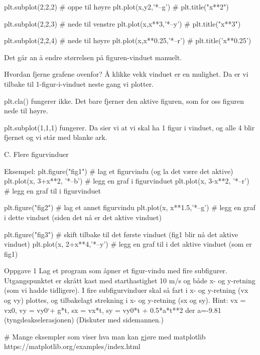 plt.subplot(2,2,2)          # oppe til høyre
plt.plot(x,y2,'*--g')       # 
plt.title("x**2")

plt.subplot(2,2,3)          # nede til venstre
plt.plot(x,x**3,'*--y')     # 
plt.title("x**3")

plt.subplot(2,2,4)          # nede til høyre
plt.plot(x,x**0.25,'*--r')  # 
plt.title('x**0.25')


Det går an å endre størrelsen på figuren-vinduet manuelt. 


Hvordan fjerne grafene ovenfor? 
Å klikke vekk vinduet er en mulighet. Da er vi tilbake til 1-figur-i-vinduet neste gang vi plotter. 

plt.cla()  fungerer ikke. Det bare fjerner den aktive figuren, som for oss figuren nede til høyre. 

plt.subplot(1,1,1) fungerer. Da sier vi at vi skal ha 1 figur i vinduet, og alle 4 blir fjernet 
og vi står med blanke ark. 




C. Flere figurvinduer 

Eksempel: 
plt.figure("fig1")                     # lag et figurvindu (og la det være det aktive)
plt.plot(x, 3+x**2, '*--b')          # legg en graf i figurvinduet
plt.plot(x, 3-x**2, '*--r')          # legg en graf til i figurvinduet

plt.figure("fig2")                     # lag et annet figurvindu
plt.plot(x, x**1.5,'*--g')             # legg en graf i dette vinduet (siden det nå er det aktive vinduet)

plt.figure("fig3")                     # skift tilbake til det første vinduet (fig1 blir nå det aktive vinduet)
plt.plot(x, 2+x**4,'*--y')             # legg en graf til i det aktive vinduet (som er fig1)




Oppgave 1
Lag et program som åpner et figur-vindu med fire subfigurer.
Utgangspunktet er skrått kast med starthastighet 10 m/s og både x- og y-retning (som vi hadde tidligere).
I fire subfigurvinduer skal så fart i x- og y-retning (vx og vy) plottes,
og tilbakelagt strekning i x- og y-retning (sx og sy). 
Hint: vx = vx0, vy = vy0`+ g*t, sx = vx*t, sy = vy0*t + 0.5*a*t**2  der a=-9.81 (tyngdeakselerasjonen)
(Diskuter med sidemannen.) 



# Mange eksempler som viser hva man kan gjøre med matplotlib
https://matplotlib.org/examples/index.html

